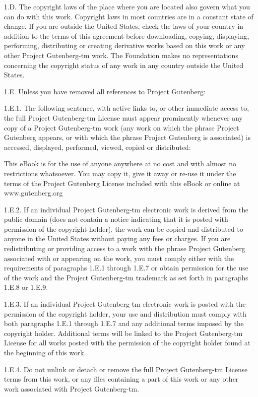\documentclass{article}
\begin{document}
1.D.  The copyright laws of the place where you are located also govern
what you can do with this work.  Copyright laws in most countries are in
a constant state of change.  If you are outside the United States, check
the laws of your country in addition to the terms of this agreement
before downloading, copying, displaying, performing, distributing or
creating derivative works based on this work or any other Project
Gutenberg-tm work.  The Foundation makes no representations concerning
the copyright status of any work in any country outside the United
States.

1.E.  Unless you have removed all references to Project Gutenberg:

1.E.1.  The following sentence, with active links to, or other immediate
access to, the full Project Gutenberg-tm License must appear prominently
whenever any copy of a Project Gutenberg-tm work (any work on which the
phrase Project Gutenberg appears, or with which the phrase Project
Gutenberg is associated) is accessed, displayed, performed, viewed,
copied or distributed:

This eBook is for the use of anyone anywhere at no cost and with
almost no restrictions whatsoever.  You may copy it, give it away or
re-use it under the terms of the Project Gutenberg License included
with this eBook or online at www.gutenberg.org

1.E.2.  If an individual Project Gutenberg-tm electronic work is derived
from the public domain (does not contain a notice indicating that it is
posted with permission of the copyright holder), the work can be copied
and distributed to anyone in the United States without paying any fees
or charges.  If you are redistributing or providing access to a work
with the phrase Project Gutenberg associated with or appearing on the
work, you must comply either with the requirements of paragraphs 1.E.1
through 1.E.7 or obtain permission for the use of the work and the
Project Gutenberg-tm trademark as set forth in paragraphs 1.E.8 or
1.E.9.

1.E.3.  If an individual Project Gutenberg-tm electronic work is posted
with the permission of the copyright holder, your use and distribution
must comply with both paragraphs 1.E.1 through 1.E.7 and any additional
terms imposed by the copyright holder.  Additional terms will be linked
to the Project Gutenberg-tm License for all works posted with the
permission of the copyright holder found at the beginning of this work.

1.E.4.  Do not unlink or detach or remove the full Project Gutenberg-tm
License terms from this work, or any files containing a part of this
work or any other work associated with Project Gutenberg-tm.
\end{document}
